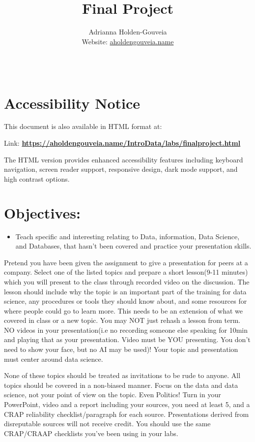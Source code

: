 \documentclass[12pt]{article}
\title{Final Project}
\author{
        Adrianna Holden-Gouveia \\
        Website: \href{https://aholdengouveia.name}{aholdengouveia.name}\\ 
        \date{\vspace{-5ex}}
        \faGithub {: aholdengouveia} \\
        }
\begin{document}
    

\maketitle



\section*{Accessibility Notice}
This document is also available in HTML format at:

Link: \href{https://aholdengouveia.name/IntroData/labs/finalproject.html}{\textbf{https://aholdengouveia.name/IntroData/labs/finalproject.html}}

The HTML version provides enhanced accessibility features including keyboard navigation, screen reader support, responsive design, dark mode support, and high contrast options.

\section*{Objectives:}
\begin{itemize}
    \item Teach specific and interesting relating to Data, information, Data Science, and Databases, that hasn't been covered and practice your presentation skills.
\end{itemize}

Pretend you have been given the assignment to give a presentation for peers at a company. Select one of the listed topics and prepare a short lesson(9-11 minutes) which you will present to the class through recorded video on the discussion. The lesson should include why the topic is an important part of the training for data science, any procedures or tools they should know about, and some resources for where people could go to learn more.  This needs to be an extension of what we covered in class or a new topic.  You may NOT just rehash a lesson from term.  NO videos in your presentation(i.e no recording someone else speaking for 10min and playing that as your presentation.  Video must be YOU presenting. You don't need to show your face, but no AI may be used)! Your topic and presentation must center around data science. 

None of these topics should be treated as invitations to be rude to anyone.  All topics should be covered in a non-biased manner.  Focus on the data and data science, not your point of view on the topic.  Even Politics!
Turn in your PowerPoint, video and a report including your sources, you need at least 5, and a CRAP reliability checklist/paragraph for each source. Presentations derived from disreputable sources will not receive credit.  You should use the same CRAP/CRAAP checklists you've been using in your labs.
\end{document}
